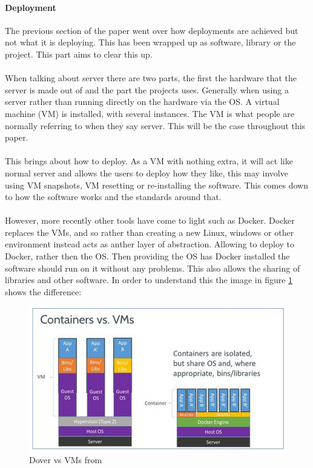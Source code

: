 \paragraph{Deployment}

The previous section of the paper went over how deployments are achieved but not what it is deploying. This has been wrapped up as software, library or the project. This part aims to clear this up.
\\\\
When talking about server there are two parts, the first the hardware that the server is made out of and the part the projects uses. Generally when using a server rather than running directly on the hardware via the OS. A virtual machine (VM) is installed, with several instances. The VM is what people are normally referring to when they say server. This will be the case throughout this paper.
\\\\
This brings about how to deploy. As a VM with nothing extra, it will act like normal server and allows the users to deploy how they like, this may involve using VM snapshots, VM resetting or re-installing the software. This comes down to how the software works and the standards around that. 
\\\\
However, more recently other tools have come to light such as Docker. Docker replaces the VMs, and so rather than creating a new Linux, windows or other environment instead acts as anther layer of abstraction. Allowing to deploy to Docker, rather then the OS. Then providing the OS has Docker installed the software should run on it without any problems. This also allows the sharing of libraries and other software. In order to understand this the image in figure \ref{fig:docker-vm} shows the difference:

\begin{figure}[H]
	\centering
	\includegraphics[scale=0.45]{images/docker-vm.png}
	\caption{Dover vs VMs from \cite{docker-vm}}
	\label{fig:docker-vm}
\end{figure}


